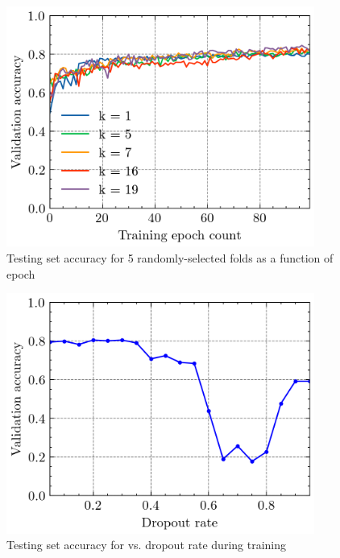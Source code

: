 \begin{figure}
    \centering
    \caption{Testing set accuracy for 5 randomly-selected folds as a function of epoch}
    \includegraphics[width=0.9\textwidth]{assets/acc_vs_epoch/acc_vs_epoch.png}
\end{figure}
\label{fig:acc_vs_epoch}
\begin{figure}
    \centering
    \caption{Testing set accuracy for vs. dropout rate during training}
    \includegraphics[width=0.9\textwidth]{assets/acc_vs_dropout_rate/acc_vs_dropout_rate.png}
\end{figure}
\label{fig:dropout_rate}
